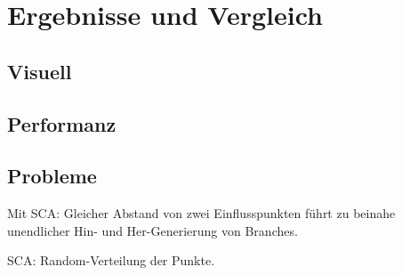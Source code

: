 \chapter{Ergebnisse und Vergleich}

\section{Visuell}

\section{Performanz}

\section{Probleme}

Mit SCA: Gleicher Abstand von zwei Einflusspunkten führt zu beinahe unendlicher Hin- und Her-Generierung von Branches.

SCA: Random-Verteilung der Punkte.